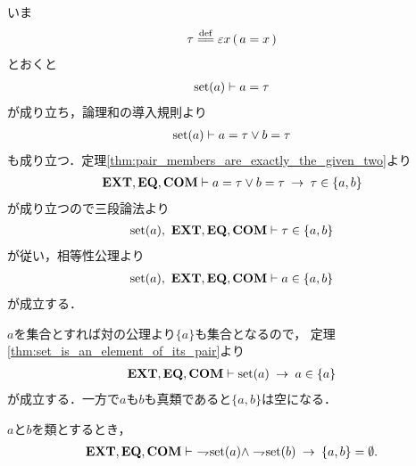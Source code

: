 	\begin{sketch}
		いま
		\begin{align}
			\tau \defeq \varepsilon x\, (\, a = x\, )
		\end{align}
		とおくと
		\begin{align}
			\operatorname*{set} (a) \vdash a = \tau
		\end{align}
		が成り立ち，論理和の導入規則より
		\begin{align}
			\operatorname*{set} (a) \vdash a = \tau \vee b = \tau
		\end{align}
		も成り立つ．定理\ref{thm:pair_members_are_exactly_the_given_two}より
		\begin{align}
			\mbox{{\bf EXT}},\mbox{{\bf EQ}},\mbox{\bf COM} \vdash 
			a = \tau \vee b = \tau \hspace{0.25em}\rightarrow\hspace{0.25em} \tau \in \{a,b\}
		\end{align}
		が成り立つので三段論法より
		\begin{align}
			\operatorname*{set} (a),\ \mbox{{\bf EXT}},\mbox{{\bf EQ}},\mbox{\bf COM} \vdash \tau \in \{a,b\}
		\end{align}
		が従い，相等性公理より
		\begin{align}
			\operatorname*{set} (a),\ \mbox{{\bf EXT}},\mbox{{\bf EQ}},\mbox{\bf COM} \vdash a \in \{a,b\}
		\end{align}
		が成立する．
		\QED
	\end{sketch}
	
	$a$を集合とすれば対の公理より$\{a\}$も集合となるので，
	定理\ref{thm:set_is_an_element_of_its_pair}より
	\begin{align}
		\mbox{{\bf EXT}},\mbox{{\bf EQ}},\mbox{\bf COM} \vdash \operatorname*{set} (a) \hspace{0.25em}\rightarrow\hspace{0.25em} a \in \{a\}
	\end{align}
	が成立する．一方で$a$も$b$も真類であると$\{a,b\}$は空になる．
	
	\begin{screen}
		\begin{thm}[真類同士の対は空]\label{thm:pair_of_proper_classes_is_emptyset}
			$a$と$b$を類とするとき，
			\begin{align}
				\EXTAX,\EQAX,\COMAX \vdash\ 
				\negation \set{a} \wedge \negation \set{b} \rarrow \{a,b\} = \emptyset.
			\end{align}
		\end{thm}
	\end{screen}
	
